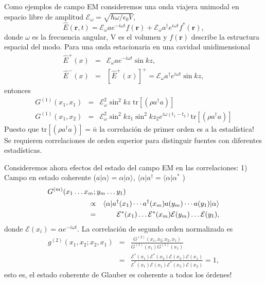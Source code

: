 \documentclass[twocolumn,aps,eqsecnum]{revtex4}
\newcommand{\mbr}{\mathbf{r}}
\newcommand{\mcE}{\mathcal{E}}
\newcommand{\adg}{a^{\dag}}
\providecommand{\bra}[1]{\langle #1 \rvert}
\providecommand{\ket}[1]{\lvert #1 \rangle}
\providecommand{\tr}[1]{\text{tr}\left[ #1 \right]}
\begin{document}
Como ejemplos de campo EM consideremos una onda viajera unimodal en 
espacio libre de amplitud 
$\mcE_{\omega} = \sqrt{\hbar \omega /\epsilon_0 V}$,    
$$ \hat{E}(\mbr,t) = \mcE_{\omega} a e^{-i\omega t} f(\mbr) 
+\mcE_{\omega} \adg e^{i\omega t} f^\ast (\mbr) , $$
donde $\omega$ es la frecuencia angular, V es el volumen y $f(\mbr)$ 
describe la estructura espacial del modo. Para una onda estacionaria en 
una cavidad unidimensional 
%
\begin{eqnarray*}
\hat{E}^+(x) &=& \mcE_{\omega} a e^{-i\omega t} \sin{kz} ,    \\ 
\hat{E}^-(x) &=& \left[ \hat{E}^+(x) \right]^+  
   = \mcE_{\omega} \adg e^{i\omega t} \sin{kz} , 
\end{eqnarray*}
entonces 
%
\begin{eqnarray*}
G^{(1)}(x_1,x_1) &=& \mcE_{\omega}^2 \sin^2{kz} \,\, \tr{(\rho \adg a)} \\ 
G^{(1)}(x_1,x_2) &=& \mcE_{\omega}^2 \sin^2{kz_1} \sin^2{kz_2} 
    e^{i\omega (t_1-t_2)} \tr{(\rho \adg a)}
\end{eqnarray*}
Puesto que $\tr{(\rho \adg a)} = \bar{n}$ la correlaci\'on de primer 
orden es  a la estad\'istica! Se requieren correlaciones 
de orden superior para distinguir fuentes con diferentes estad\'isticas. 

Consideremos ahora efectos del estado del campo EM en las correlaciones: 
1) Campo en estado coherente 
($a \ket{\alpha} = \alpha \ket{\alpha}$, 
$\bra{\alpha} \adg = \bra{\alpha} \alpha^\ast$ ) 
%
\begin{eqnarray*}
\lefteqn{ G^{(m)}(x_1 \ldots x_m; y_m \ldots y_1) } \hspace{2cm} \\
&\propto& 
\bra{\alpha} \adg (x_1) \cdots \adg (x_m) a(y_m) \cdots a(y_1) 
    \ket{\alpha}  \\ 
&=& \mcE^\ast (x_1) \ldots \mcE^\ast (x_m) \mcE (y_m) \ldots \mcE (y_1) , 
\end{eqnarray*}
donde $\mcE (x_i) = \alpha e^{-i \omega t}$. La correlaci\'on de segundo orden normalizada es  
%
\begin{eqnarray*}
g^{(2)}(x_1,x_2; x_2,x_1) &=& \frac{ G^{(2)} (x_1,x_2; x_2,x_1) }
    {G^{(1)} (x_1) G^{(1)} (x_1)} \\ 
  &=& \frac{ \mcE^\ast(x_1) \mcE^\ast(x_2) \mcE (x_2) \mcE (x_1) }
    { \mcE^\ast(x_1) \mcE (x_1) \mcE^\ast(x_2) \mcE (x_2) } = 1 , 
\end{eqnarray*}
esto es, el estado coherente de Glauber es coherente a todos los 
\'ordenes!
\end{document}
